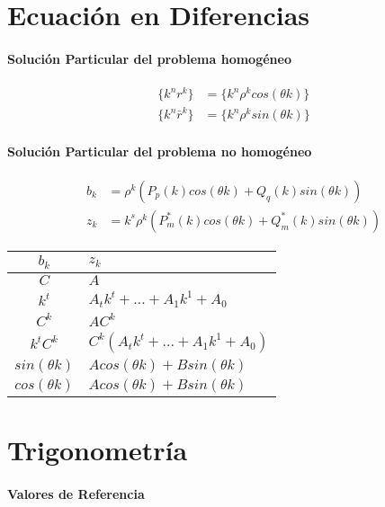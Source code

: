 \documentclass{article}
\begin{document}
\begin{multicols}{2}
    \section{Ecuación en Diferencias}

      \paragraph{Solución Particular del problema homogéneo}

        \begin{align*}
          \{k^nr^k \}&= \{k^n\rho^k cos(\theta k)\}\\
          \{k^n\bar{r}^k \} &=\{k^n\rho^k sin(\theta k)\}
        \end{align*}

      \paragraph{Solución Particular del problema no homogéneo}

      \begin{align*}
        b_k &= \rho^k(P_p(k) cos(\theta k) + Q_q(k) sin(\theta k ))\\
        z_k &= k^s\rho^k(P^*_m(k) cos(\theta k) + Q^*_m(k) sin(\theta k ))
      \end{align*}


      \begin{tabular}{c | l}
        $b_k$ & $z_k$ \\ \hline
        $C$ & $A$ \\
        $k^t$ & $A_tk^t + ... + A_1k^1 + A_0$ \\
        $C^k$ & $AC^k$ \\
        $k^tC^k$ & $C^k(A_tk^t + ... + A_1k^1 + A_0)$\\
        $sin(\theta k)$ & $Acos(\theta k) + Bsin(\theta k)$ \\
        $cos(\theta k)$ & $Acos(\theta k) + Bsin(\theta k)$
      \end{tabular}

    \appendix
    \section{Trigonometría}

      \paragraph{Valores de Referencia}


\end{multicols}
\end{document}
